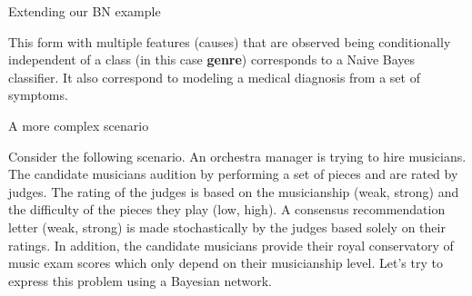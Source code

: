 \documentclass[12pt]{beamer}
\begin{document}
\begin{frame}{Extending our BN example}

  This form with multiple features (causes) that are observed being
  conditionally independent of a class (in this case {\bf genre})
  corresponds to a Naive Bayes classifier. It also correspond to
  modeling a medical diagnosis from a set of symptoms.
  
\begin{center} 
\end{center} 
\end{frame}

\begin{frame}{A more complex scenario}

Consider the following scenario. An orchestra manager is trying to
hire musicians. The candidate musicians audition by performing a set
of pieces and are rated by judges. The rating of the judges is based
on the musicianship (weak, strong) and the difficulty of the pieces
they play (low, high). A consensus recommendation letter (weak,
strong) is made stochastically by the judges based solely on their
ratings. In addition, the candidate musicians provide their royal
conservatory of music exam scores which only depend on their
musicianship level. Let's try to express this problem using a Bayesian
network.

  \end{frame} 
\end{document}
